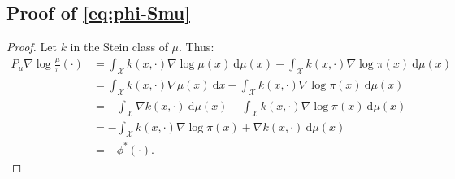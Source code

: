 \documentclass{article}
\newcommand{\X}{\mathcal{X}}
\renewcommand{\d}{\: \mathrm{d}}
\begin{document}
\subsection{Proof of \ref{eq:phi-Smu}}\label{pro:phi-Smu}
\begin{proof}
    Let $k$ in the Stein class of $\mu$. Thus:
    \begin{equation}
      \begin{split}
        P_\mu \nabla \log \frac{\mu}{\pi} (\cdot) &=
          \int_\X k(x, \cdot) \nabla \log \mu(x) \d \mu(x) - \int_\X k(x, \cdot) \nabla \log \pi (x) \d \mu(x) \\
        &= \int_\X k(x, \cdot) \nabla \mu(x) \d x - \int_\X k(x, \cdot) \nabla \log \pi (x) \d \mu(x) \\
        &= - \int_\X \nabla k(x, \cdot) \d \mu(x) - \int_\X k(x, \cdot) \nabla \log \pi (x) \d \mu(x) \\
        &= - \int_\X k(x, \cdot) \nabla \log \pi (x) + \nabla k(x, \cdot) \d \mu(x) \\
        &= -\phi^*(\cdot).
      \end{split}
    \end{equation}
\end{proof}
\end{document}
